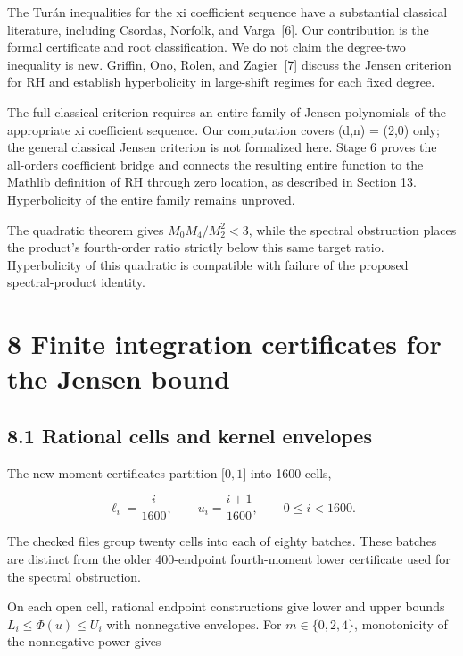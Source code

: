 \documentclass[
  11pt,
]{article}
\begin{document}
The Turán inequalities for the xi coefficient sequence have a substantial classical literature, including Csordas, Norfolk, and Varga~{[}6{]}. Our contribution is the formal certificate and root classification. We do not claim the degree-two inequality is new. Griffin, Ono, Rolen, and Zagier~{[}7{]} discuss the Jensen criterion for RH and establish hyperbolicity in large-shift regimes for each fixed degree.

The full classical criterion requires an entire family of Jensen polynomials of the appropriate xi coefficient sequence. Our computation covers (d,n) = (2,0) only; the general classical Jensen criterion is not formalized here. Stage 6 proves the all-orders coefficient bridge and connects the resulting entire function to the Mathlib definition of RH through zero location, as described in Section 13. Hyperbolicity of the entire family remains unproved.

The quadratic theorem gives \(M_{0}M_{4}/M_{2}^{2} < 3\), while the spectral obstruction places the product's fourth-order ratio strictly below this same target ratio. Hyperbolicity of this quadratic is compatible with failure of the proposed spectral-product identity.

\hypertarget{finite-integration-certificates-for-the-jensen-bound}{%
\section{8 Finite integration certificates for the Jensen bound}\label{finite-integration-certificates-for-the-jensen-bound}}

\hypertarget{rational-cells-and-kernel-envelopes}{%
\subsection{8.1 Rational cells and kernel envelopes}\label{rational-cells-and-kernel-envelopes}}

The new moment certificates partition \(\lbrack 0,1\rbrack\) into 1600 cells,

\[\ell_{i} = \frac{i}{1600},\quad\quad u_{i} = \frac{i + 1}{1600},\quad\quad 0 \leq i < 1600.\]

The checked files group twenty cells into each of eighty batches. These batches are distinct from the older 400-endpoint fourth-moment lower certificate used for the spectral obstruction.

On each open cell, rational endpoint constructions give lower and upper bounds \(L_{i} \leq \Phi(u) \leq U_{i}\) with nonnegative envelopes. For \(m \in \{ 0,2,4\}\), monotonicity of the nonnegative power gives
\end{document}
